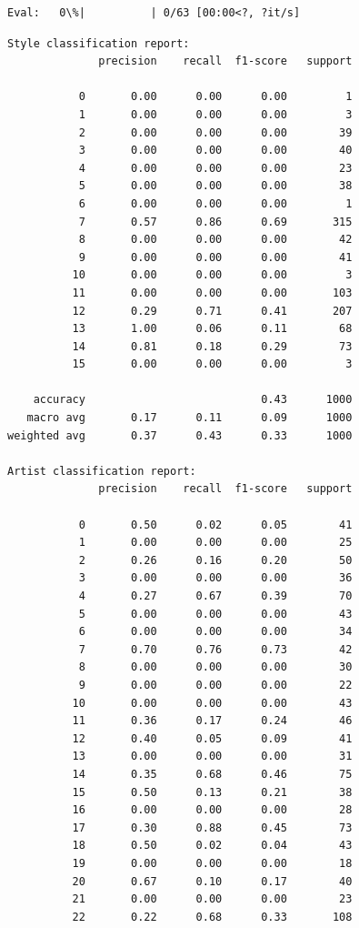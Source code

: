 \documentclass[11pt]{article}
\begin{document}
    
    \begin{Verbatim}[commandchars=\\\{\}]
Eval:   0\%|          | 0/63 [00:00<?, ?it/s]
    \end{Verbatim}

    
    \begin{Verbatim}[commandchars=\\\{\}]
Style classification report:
              precision    recall  f1-score   support

           0       0.00      0.00      0.00         1
           1       0.00      0.00      0.00         3
           2       0.00      0.00      0.00        39
           3       0.00      0.00      0.00        40
           4       0.00      0.00      0.00        23
           5       0.00      0.00      0.00        38
           6       0.00      0.00      0.00         1
           7       0.57      0.86      0.69       315
           8       0.00      0.00      0.00        42
           9       0.00      0.00      0.00        41
          10       0.00      0.00      0.00         3
          11       0.00      0.00      0.00       103
          12       0.29      0.71      0.41       207
          13       1.00      0.06      0.11        68
          14       0.81      0.18      0.29        73
          15       0.00      0.00      0.00         3

    accuracy                           0.43      1000
   macro avg       0.17      0.11      0.09      1000
weighted avg       0.37      0.43      0.33      1000

Artist classification report:
              precision    recall  f1-score   support

           0       0.50      0.02      0.05        41
           1       0.00      0.00      0.00        25
           2       0.26      0.16      0.20        50
           3       0.00      0.00      0.00        36
           4       0.27      0.67      0.39        70
           5       0.00      0.00      0.00        43
           6       0.00      0.00      0.00        34
           7       0.70      0.76      0.73        42
           8       0.00      0.00      0.00        30
           9       0.00      0.00      0.00        22
          10       0.00      0.00      0.00        43
          11       0.36      0.17      0.24        46
          12       0.40      0.05      0.09        41
          13       0.00      0.00      0.00        31
          14       0.35      0.68      0.46        75
          15       0.50      0.13      0.21        38
          16       0.00      0.00      0.00        28
          17       0.30      0.88      0.45        73
          18       0.50      0.02      0.04        43
          19       0.00      0.00      0.00        18
          20       0.67      0.10      0.17        40
          21       0.00      0.00      0.00        23
          22       0.22      0.68      0.33       108


\end{Verbatim}
\end{document}

